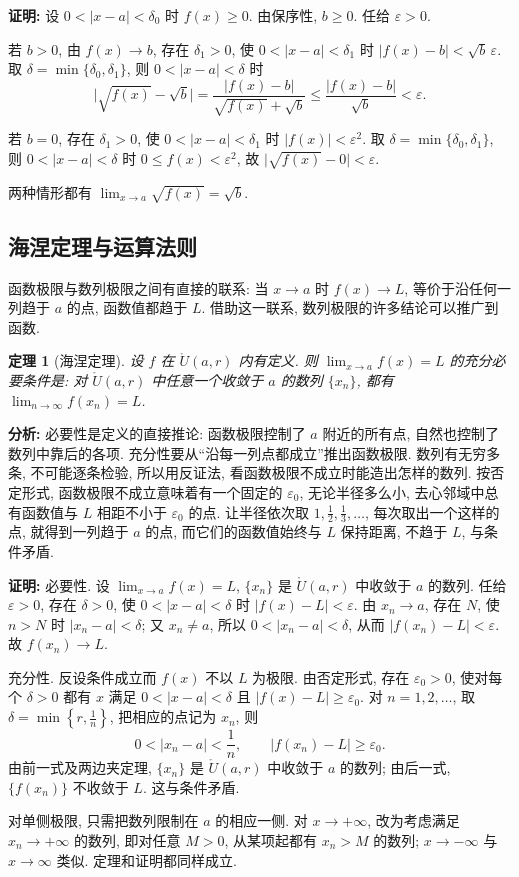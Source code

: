 \documentclass[UTF8,openany]{ctexbook}
\theoremstyle{chinesetextbook}
\newtheorem{theorem}{定理}[section]
\newenvironment{cnproof}{\par\indent\textbf{证明:} \ignorespaces}{\par}
\begin{document}
\begin{cnproof}
设 $0<|x-a|<\delta_0$ 时 $f(x)\ge0$. 由保序性, $b\ge0$. 任给 $\varepsilon>0$.

若 $b>0$, 由 $f(x)\to b$, 存在 $\delta_1>0$, 使 $0<|x-a|<\delta_1$ 时 $|f(x)-b|<\sqrt b\,\varepsilon$. 取 $\delta=\min\{\delta_0,\delta_1\}$, 则 $0<|x-a|<\delta$ 时
\[
\bigl|\sqrt{f(x)}-\sqrt b\bigr|=\frac{|f(x)-b|}{\sqrt{f(x)}+\sqrt b}\le\frac{|f(x)-b|}{\sqrt b}<\varepsilon.
\]

若 $b=0$, 存在 $\delta_1>0$, 使 $0<|x-a|<\delta_1$ 时 $|f(x)|<\varepsilon^2$. 取 $\delta=\min\{\delta_0,\delta_1\}$, 则 $0<|x-a|<\delta$ 时 $0\le f(x)<\varepsilon^2$, 故 $\bigl|\sqrt{f(x)}-0\bigr|<\varepsilon$.

两种情形都有 $\displaystyle\lim_{x\to a}\sqrt{f(x)}=\sqrt b$.
\end{cnproof}
\subsection{海涅定理与运算法则}
函数极限与数列极限之间有直接的联系: 当 $x\to a$ 时 $f(x)\to L$, 等价于沿任何一列趋于 $a$ 的点, 函数值都趋于 $L$. 借助这一联系, 数列极限的许多结论可以推广到函数.
\begin{theorem}[海涅定理]
设 $f$ 在 $\mathring U(a,r)$ 内有定义. 则 $\displaystyle\lim_{x\to a}f(x)=L$ 的充分必要条件是: 对 $\mathring U(a,r)$ 中任意一个收敛于 $a$ 的数列 $\{x_n\}$, 都有 $\displaystyle\lim_{n\to\infty}f(x_n)=L$.
\end{theorem}
\par\indent\textbf{分析:} 必要性是定义的直接推论: 函数极限控制了 $a$ 附近的所有点, 自然也控制了数列中靠后的各项. 充分性要从“沿每一列点都成立”推出函数极限. 数列有无穷多条, 不可能逐条检验, 所以用反证法, 看函数极限不成立时能造出怎样的数列. 按否定形式, 函数极限不成立意味着有一个固定的 $\varepsilon_0$, 无论半径多么小, 去心邻域中总有函数值与 $L$ 相距不小于 $\varepsilon_0$ 的点. 让半径依次取 $\displaystyle1,\frac12,\frac13,\ldots$, 每次取出一个这样的点, 就得到一列趋于 $a$ 的点, 而它们的函数值始终与 $L$ 保持距离, 不趋于 $L$, 与条件矛盾.
\begin{cnproof}
必要性. 设 $\displaystyle\lim_{x\to a}f(x)=L$, $\{x_n\}$ 是 $\mathring U(a,r)$ 中收敛于 $a$ 的数列. 任给 $\varepsilon>0$, 存在 $\delta>0$, 使 $0<|x-a|<\delta$ 时 $|f(x)-L|<\varepsilon$. 由 $x_n\to a$, 存在 $N$, 使 $n>N$ 时 $|x_n-a|<\delta$; 又 $x_n\ne a$, 所以 $0<|x_n-a|<\delta$, 从而 $|f(x_n)-L|<\varepsilon$. 故 $f(x_n)\to L$.

充分性. 反设条件成立而 $f(x)$ 不以 $L$ 为极限. 由否定形式, 存在 $\varepsilon_0>0$, 使对每个 $\delta>0$ 都有 $x$ 满足 $0<|x-a|<\delta$ 且 $|f(x)-L|\ge\varepsilon_0$. 对 $n=1,2,\ldots$, 取 $\displaystyle\delta=\min\left\{r,\frac1n\right\}$, 把相应的点记为 $x_n$, 则
\[
0<|x_n-a|<\frac1n,\qquad|f(x_n)-L|\ge\varepsilon_0.
\]
由前一式及两边夹定理, $\{x_n\}$ 是 $\mathring U(a,r)$ 中收敛于 $a$ 的数列; 由后一式, $\{f(x_n)\}$ 不收敛于 $L$. 这与条件矛盾.
\end{cnproof}
对单侧极限, 只需把数列限制在 $a$ 的相应一侧. 对 $x\to+\infty$, 改为考虑满足 $x_n\to+\infty$ 的数列, 即对任意 $M>0$, 从某项起都有 $x_n>M$ 的数列; $x\to-\infty$ 与 $x\to\infty$ 类似. 定理和证明都同样成立.
\end{document}
